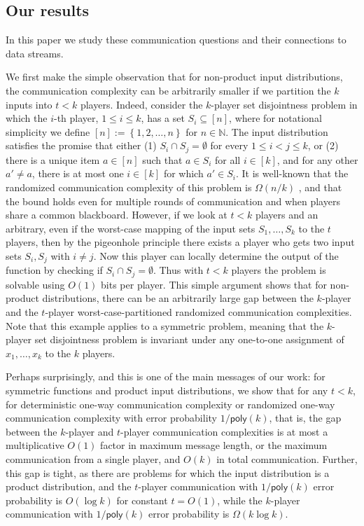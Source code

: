 \documentclass[11pt]{article}
\numberwithin{equation}{section}
\theoremstyle{definition}
\theoremstyle{plain}
\newcommand{\N}{\mathbb N}
\newcommand{\set}[1]{{\left \{{#1} \right \}}}
\newcommand{\poly}{\mathsf{poly}}
\newcommand{\bigo}[1]{\ensuremath{{{O} \left( {#1} \right)}}}
\newcommand{\bigomega}[1]{\ensuremath{{\Omega \left( {#1} \right)}}}
\newcommand{\eqdef}{\ensuremath{:=}}
\begin{document}
\subsection{Our results}
In this paper we study these communication questions and their connections to data streams.

We first make the simple observation that for non-product input distributions, the communication complexity can be arbitrarily smaller if we partition the $k$ inputs into $t < k$ players. 
Indeed, consider the $k$-player set disjointness problem in which the $i$-th player, $1 \leq i \leq k$, has a set $S_i \subseteq [n]$, 
where for notational simplicity we define $[n]\eqdef \set{1,2,\dots, n}$ for $n\in \N$. 
The input distribution satisfies the promise that either (1) $S_i \cap S_j = \emptyset$ for every $1\le i < j \le k$, or (2) there is a unique item $a \in [n]$ such that $a \in S_i$ for all $i \in [k]$, and for any other $a' \neq a$, there is at most one $i \in [k]$ for which $a' \in S_i$. It is well-known that the randomized communication complexity of this problem is $\bigomega{n/k}$ \cite{BarYossef:2004eya,g09,jayram2009hellinger}, and that the bound holds even for multiple rounds of communication and when players share a common blackboard. 
However, if we look at $t < k$ players and an arbitrary, even if the worst-case mapping of the input sets $S_1, \ldots, S_k$ to the $t$ players, then by the pigeonhole principle there exists a player who gets two input sets $S_i, S_j$ with $i \ne j$. 
Now this player can locally determine the output of the function by checking if $S_i \cap S_j=\emptyset$. 
Thus with $t < k$ players the problem is solvable using $\bigo{1}$ bits per player. This simple argument shows that for non-product distributions, there can be an arbitrarily large gap between the $k$-player and the $t$-player worst-case-partitioned randomized communication complexities. 
Note that this example applies to a symmetric problem, meaning that the $k$-player set disjointness problem is invariant under any one-to-one assignment of $x_1, \ldots, x_k$ to the $k$ players.

Perhaps surprisingly, and this is one of the main messages of our work: for symmetric functions and product input distributions, we show that for any $t < k$, for deterministic one-way communication complexity or randomized one-way communication complexity with error probability $1/\poly(k)$, that is, the gap between the $k$-player and $t$-player communication complexities is at most a multiplicative $\bigo{1}$ factor in maximum message length, or the maximum communication from a single player, and $O(k)$ in total communication. Further, this gap is tight, as there are problems for which the input distribution is a product distribution, and the $t$-player communication with $1/\poly(k)$ error probability is $\bigo{\log k}$ for constant $t=\bigo{1}$, while the $k$-player communication with $1/\poly(k)$ error probability is $\bigomega{k \log k}$. 
\end{document}

